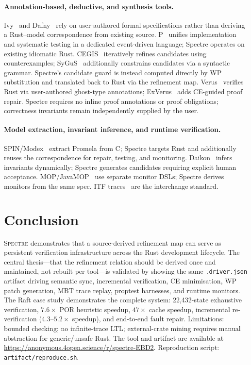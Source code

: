 \documentclass[runningheads]{../paper-vmcai-2027/llncs}
\begin{document}
\paragraph{Annotation-based, deductive, and synthesis tools.}
Ivy~\cite{22_padon2016ivy} and Dafny~\cite{18_leino2010dafny} rely on
user-authored formal specifications rather than deriving a Rust--model
correspondence from existing source.
P~\cite{6_desai2013p} unifies implementation and systematic testing in a
dedicated event-driven language; Spectre operates on existing idiomatic Rust.
CEGIS~\cite{24_solarlezama2008program} iteratively refines candidates using
counterexamples; SyGuS~\cite{1_alur2013sygus} additionally constrains candidates
via a syntactic grammar. Spectre's candidate guard is instead computed directly
by WP substitution and translated back to Rust via the refinement map.
Verus~\cite{17_lattuada2023verus} verifies Rust via user-authored ghost-type
annotations; ExVerus~\cite{25_yang2026exverus} adds CE-guided proof repair.
Spectre requires no inline proof annotations or proof obligations; correctness
invariants remain independently supplied by the user.

\paragraph{Model extraction, invariant inference, and runtime verification.}
SPIN/Modex~\cite{9_holzmann2003spin,10_holzmann2001modex} extract Promela from C;
Spectre targets Rust and additionally reuses the correspondence for repair,
testing, and monitoring.
Daikon~\cite{8_ernst2007daikon} infers invariants dynamically; Spectre generates
candidates requiring explicit human acceptance.
MOP/JavaMOP~\cite{3_chen2007mop,14_jin2012javamop} use separate monitor DSLs;
Spectre derives monitors from the same spec.
ITF traces~\cite{11_informal2022itf} are the interchange standard.

\section{Conclusion}\label{sec:conclusion}

\textsc{Spectre} demonstrates that a source-derived refinement map can serve
as persistent verification infrastructure across the Rust development lifecycle.
The central thesis---that the refinement relation should be derived once and
maintained, not rebuilt per tool---is validated by showing the same
\texttt{.driver.json} artifact driving semantic sync, incremental verification,
CE minimisation, WP patch generation, MBT trace replay, proptest harnesses,
and runtime monitors.
The Raft case study demonstrates the complete system: 22{,}432-state exhaustive
verification, $7.6\times$ POR heuristic speedup, $47\times$ cache speedup,
incremental re-verification ($4.3$--$5.2\times$ speedup), and end-to-end fault repair.
Limitations: bounded checking; no infinite-trace LTL; external-crate mining
requires manual abstraction for generic/unsafe Rust.
The tool and artifact are available at \url{https://anonymous.4open.science/r/spectre-EBD2}.
Reproduction script: \texttt{artifact/reproduce.sh}.



\end{document}
